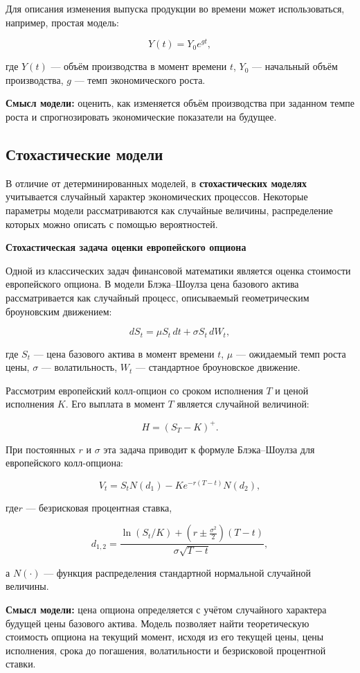 Для описания изменения выпуска продукции во времени может использоваться, 
например, простая модель:

\[
Y(t)=Y_0e^{gt},
\]

где $Y(t)$ --- объём производства в момент времени $t$, 
$Y_0$ --- начальный объём производства, $g$ --- темп экономического роста.

\textbf{Смысл модели:} оценить, как изменяется объём производства 
при заданном темпе роста и спрогнозировать экономические показатели 
на будущее.

\subsection{Стохастические модели}

В отличие от детерминированных моделей, в \textbf{стохастических моделях} 
учитывается случайный характер экономических процессов. Некоторые параметры 
модели рассматриваются как случайные величины, распределение которых можно 
описать с помощью вероятностей.

\textbf{Стохастическая задача оценки европейского опциона}

Одной из классических задач финансовой математики является оценка 
стоимости европейского опциона. В модели Блэка--Шоулза цена базового 
актива рассматривается как случайный процесс, описываемый геометрическим 
броуновским движением:

\[
dS_t = \mu S_t\,dt + \sigma S_t\,dW_t,
\]

где $S_t$ --- цена базового актива в момент времени $t$, 
$\mu$ --- ожидаемый темп роста цены, $\sigma$ --- волатильность, 
$W_t$ --- стандартное броуновское движение.

Рассмотрим европейский колл-опцион со сроком исполнения $T$ 
и ценой исполнения $K$. Его выплата в момент $T$ является случайной 
величиной:

\[
H=(S_T-K)^+.
\]

При постоянных $r$ и $\sigma$ эта задача приводит к формуле 
Блэка--Шоулза для европейского колл-опциона:

\[
V_t =
S_t N(d_1)
-
K e^{-r(T-t)}N(d_2),
\]

где$r$ --- безрисковая процентная ставка,

\[
d_{1,2} =
\frac{
	\ln(S_t/K)+(r \pm \frac{\sigma^2}{2})(T-t)
}{
	\sigma\sqrt{T-t}
},
\]

а $N(\cdot)$ --- функция распределения стандартной нормальной случайной 
величины.

\textbf{Смысл модели:} цена опциона определяется с учётом случайного 
характера будущей цены базового актива. Модель позволяет найти 
теоретическую стоимость опциона на текущий момент, исходя из его 
текущей цены, цены исполнения, срока до погашения, волатильности 
и безрисковой процентной ставки.

\newpage